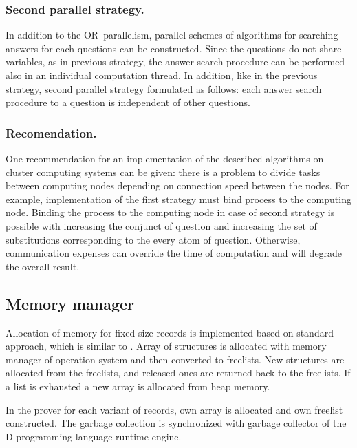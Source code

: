 \documentclass[runningheads,a4paper]{llncs}
\begin{document}
\subsubsection{Second parallel strategy.}
In addition to the OR--parallelism, parallel schemes of algorithms for searching answers for each questions can be constructed. Since the questions do not share variables, as in previous strategy, the answer search procedure can be performed also in an individual computation thread. In addition, like in the previous strategy, second parallel strategy formulated as follows: each answer search procedure to a question is independent of other questions.

\subsubsection{Recomendation.}
One recommendation for an implementation of the described algorithms on cluster computing systems can be given: there is a problem to divide tasks between computing nodes depending on connection speed between the nodes. For example, implementation of the first strategy must bind process to the computing node. Binding the process to the computing node in case of second strategy is possible with increasing the conjunct of question and increasing the set of substitutions corresponding to the every atom of question. Otherwise, communication expenses can override the time of computation and will degrade the overall result.

\subsection{Memory manager}
Allocation of memory for fixed size records is implemented based on standard approach, which is similar to \cite{gmemory}. Array of structures is allocated with memory manager of operation system and then converted to freelists. New structures are allocated from the freelists, and released ones are returned back to the freelists. If a list is exhausted a new array is allocated from heap memory.

In the prover for each variant of records, own array is allocated and own freelist constructed. The garbage collection is synchronized with garbage collector of the D programming language runtime engine.


\end{document}
